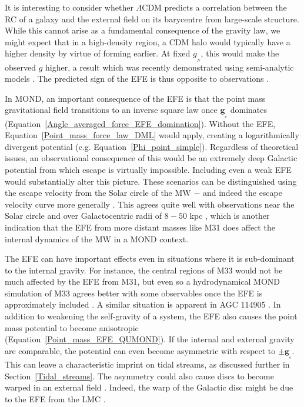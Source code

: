 \documentclass[fleqn,usenatbib,useAMS,onecolumn]{mnras} %
\begin{document}
It is interesting to consider whether $\Lambda$CDM predicts a correlation between the RC of a galaxy and the external field on its barycentre from large-scale structure. While this cannot arise as a fundamental consequence of the gravity law, we might expect that in a high-density region, a CDM halo would typically have a higher density by virtue of forming earlier. At fixed $g_{_N}$, this would make the observed $g$ higher, a result which was recently demonstrated using semi-analytic models \citep{Paranjape_2022}. The predicted sign of the EFE is thus opposite to observations \citep{Chae_2020_EFE, Chae_2021}.

In MOND, an important consequence of the EFE is that the point mass gravitational field transitions to an inverse square law once $\bm{g}_{_e}$ dominates (Equation~\ref{Angle_averaged_force_EFE_domination}). Without the EFE, Equation~\ref{Point_mass_force_law_DML} would apply, creating a logarithmically divergent potential (e.g. Equation~\ref{Phi_point_simple}). Regardless of theoretical issues, an observational consequence of this would be an extremely deep Galactic potential from which escape is virtually impossible. Including even a weak EFE would substantially alter this picture. These scenarios can be distinguished using the escape velocity from the Solar circle of the MW \citep{Famaey_2007, Wu_2008} $-$ and indeed the escape velocity curve more generally \citep{Banik_2018_escape}. This agrees quite well with observations near the Solar circle \citep{Monari_2018} and over Galactocentric radii of $8-50$ kpc \citep{Williams_2017}, which is another indication that the EFE from more distant masses like M31 does affect the internal dynamics of the MW in a MOND context.

The EFE can have important effects even in situations where it is sub-dominant to the internal gravity. For instance, the central regions of M33 would not be much affected by the EFE from M31, but even so a hydrodynamical MOND simulation of M33 agrees better with some observables once the EFE is approximately included \citep{Banik_2020_M33}. A similar situation is apparent in AGC 114905 \citep{Banik_2022_fake_inclination}. In addition to weakening the self-gravity of a system, the EFE also causes the point mass potential to become anisotropic (Equation~\ref{Point_mass_EFE_QUMOND}). If the internal and external gravity are comparable, the potential can even become asymmetric with respect to $\pm \bm{g}_{_e}$. This can leave a characteristic imprint on tidal streams, as discussed further in Section~\ref{Tidal_streams}. The asymmetry could also cause discs to become warped in an external field \citep{Banik_2020_M33}. Indeed, the warp of the Galactic disc might be due to the EFE from the LMC \citep{Brada_2000_warp}.
\end{document}
